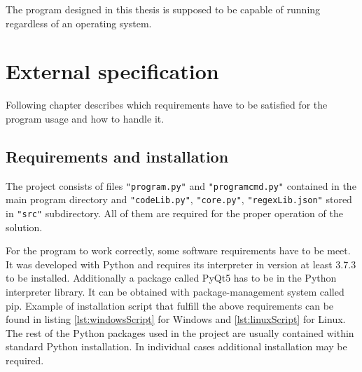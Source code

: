\documentclass[a4paper,twoside,12pt]{book}
\begin{document}
The program designed in this thesis is supposed to be capable of running regardless of an operating system.



\chapter{External specification}

Following chapter describes which requirements have to be satisfied for the program usage and how to handle it.

\section{Requirements and installation}

The project consists of files \lstinline|"program.py"| and \lstinline|"programcmd.py"| contained in the main program directory and
\lstinline|"codeLib.py"|, \lstinline|"core.py"|, \lstinline|"regexLib.json"| stored in \lstinline|"src"| subdirectory. All of them are 
required for the proper operation of the solution.

For the program to work correctly, some software requirements have to be meet. It was developed with 
Python and requires its interpreter in version at least 3.7.3 to be installed. Additionally a package called PyQt5 has 
to be in the Python interpreter library. It can be obtained with package-management 
system called pip. Example of installation script that fulfill the above requirements can be found
in listing \ref{lst:windowsScript} for Windows and \ref{lst:linuxScript} for Linux.
The rest of the Python packages used in the project are usually contained within standard Python installation.
In individual cases additional installation may be required.
\end{document}
